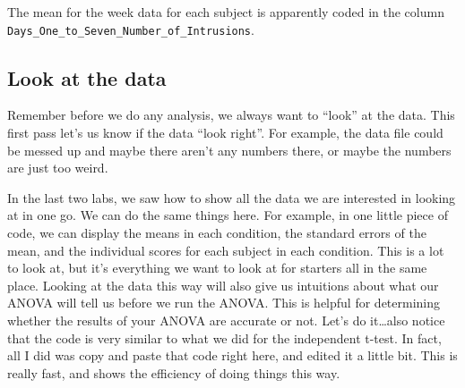 \documentclass[
]{book}
\begin{document}
The mean for the week data for each subject is apparently coded in the column \texttt{Days\_One\_to\_Seven\_Number\_of\_Intrusions}.

\hypertarget{look-at-the-data-2}{%
\subsection{Look at the data}\label{look-at-the-data-2}}

Remember before we do any analysis, we always want to ``look'' at the data. This first pass let's us know if the data ``look right''. For example, the data file could be messed up and maybe there aren't any numbers there, or maybe the numbers are just too weird.

In the last two labs, we saw how to show all the data we are interested in looking at in one go. We can do the same things here. For example, in one little piece of code, we can display the means in each condition, the standard errors of the mean, and the individual scores for each subject in each condition. This is a lot to look at, but it's everything we want to look at for starters all in the same place. Looking at the data this way will also give us intuitions about what our ANOVA will tell us before we run the ANOVA. This is helpful for determining whether the results of your ANOVA are accurate or not. Let's do it\ldots also notice that the code is very similar to what we did for the independent t-test. In fact, all I did was copy and paste that code right here, and edited it a little bit. This is really fast, and shows the efficiency of doing things this way.
\end{document}
